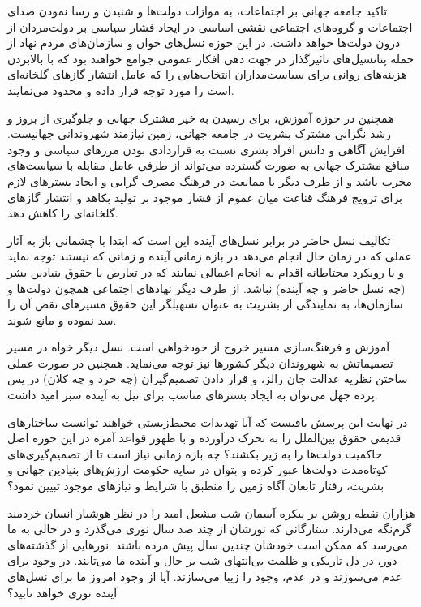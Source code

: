 تاکید جامعه جهانی بر اجتماعات، به موازات دولت‌ها و شنیدن و رسا نمودن صدای اجتماعات و گروه‌های اجتماعی نقشی اساسی در ایجاد فشار سیاسی بر دولت‌مردان از درون دولت‌ها خواهد داشت. 
در این حوزه نسل‌های جوان و سازمان‌های مردم نهاد از جمله پتانسیل‌های تاثیر‌گذار در جهت دهی افکار عمومی جوامع خواهند بود که با بالابردن هزینه‌های روانی برای سیاست‌مداران انتخاب‌هایی را که عامل انتشار گاز‌های گلخانه‌ای است را مورد توجه قرار داده و محدود می‌نمایند. 

همچنین در حوزه آموزش، برای رسیدن به خیر مشترک جهانی و جلوگیری از بروز و رشد نگرانی مشترک بشریت در جامعه جهانی، زمین نیازمند شهروندانی جهانیست. افزایش آگاهی و دانش افراد بشری نسبت به قراردادی بودن مرز‌های سیاسی و وجود منافع مشترک جهانی به صورت گسترده می‌تواند از طرفی عامل مقابله با سیاست‌های مخرب باشد و از طرف دیگر با ممانعت در فرهنگ مصرف گرایی و ایجاد بستر‌های لازم برای ترویج فرهنگ قناعت میان عموم از فشار موجود بر تولید بکاهد و انتشار گاز‌های گلخانه‌ای را کاهش دهد. 


تکالیف نسل حاضر در برابر نسل‌‌های آینده این است که ابتدا با چشمانی باز به آثار عملی که در زمان حال انجام می‌دهد در بازه زمانی آینده و زمانی که نیستند توجه نماید و با رویکرد محتاطانه اقدام به انجام اعمالی نمایند که در تعارض با حقوق بنیادین بشر (چه نسل حاضر و چه آینده) نباشد. از طرف دیگر نهاد‌‌های اجتماعی همچون دولت‌ها و سازمان‌ها، به نمایندگی از بشریت به عنوان تسهیلگر این حقوق مسیر‌‌های نقض آن را سد نموده و مانع شوند.

آموزش و فرهنگ‌سازی مسیر خروج از خودخواهی است. نسل دیگر خواه در مسیر تصمیماتش به شهروندان دیگر کشور‌ها نیز توجه می‌نماید. همچنین در صورت عملی ساختن نظریه عدالت جان رالز، و قرار دادن تصمیم‌گیران (چه خرد و چه کلان) در پس پرده جهل می‌توان به ایجاد بستر‌های مناسب برای نیل به آینده سبز امید داشت. 


در نهایت این پرسش باقیست که آیا تهدیدات محیط‌زیستی خواهند توانست ساختار‌های قدیمی حقوق بین‌الملل را به تحرک درآورده و با ظهور قواعد آمره در این حوزه اصل حاکمیت دولت‌ها را به زیر بکشند؟ چه بازه زمانی نیاز است تا از تصمیم‌گیری‌های کوتاه‌مدت دولت‌ها عبور کرده و بتوان در سایه حکومت ارزش‌های بنیادین جهانی و بشریت، رفتار تابعان آگاه زمین را منطبق با شرایط و نیاز‌های موجود تبیین نمود؟ 
 

هزاران نقطه روشن بر پیکره آسمان شب مشعل امید را در نظر هوشیار انسان خردمند گرم‌نگه می‌دارند. ستارگانی که نورشان از چند صد سال‌ نوری می‌گذرد و در حالی به ما می‌رسد که ممکن است خودشان چندین سال پیش مرده باشند. نور‌هایی از گذشته‌های دور، در دل تاریکی و ظلمت بی‌انتهای شب بر حال و آینده ما می‌تابند. در وجود برای عدم می‌سوزند و در عدم، وجود را زیبا می‌سازند. آیا از وجود امروز ما برای نسل‌های آینده نوری خواهد تابید؟ 


 
 
 
 
 
 
 
 







